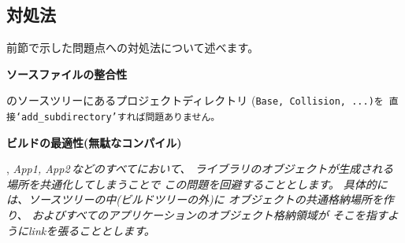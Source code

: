 \subsection{対処法}
\label{subsec:Solution}

\noindent
前節で示した問題点への対処法について述べます。

\bigskip
\noindent
\bf{ソースファイルの整合性}
\begin{narrow}[20pt]
	\SprLib のソースツリーにあるプロジェクトディレクトリ
	(\tt{Base}, \tt{Collision}, ...)を
	直接`\tt{add\_subdirectory}'すれば問題ありません。
\end{narrow}

\medskip
\noindent
\bf{ビルドの最適性(無駄なコンパイル)}
\begin{narrow}[20pt]
	\SprLib, \it{App1, App2\,}などのすべてにおいて、
	ライブラリのオブジェクトが生成される場所を共通化してしまうことで
	この問題を回避することとします。
	具体的には、\SprLib ソースツリーの中(ビルドツリーの外)に
	オブジェクトの共通格納場所を作り、
	\SprLib およびすべてのアプリケーションのオブジェクト格納領域が
	そこを指すようにlinkを張ることとします。


\end{narrow}

